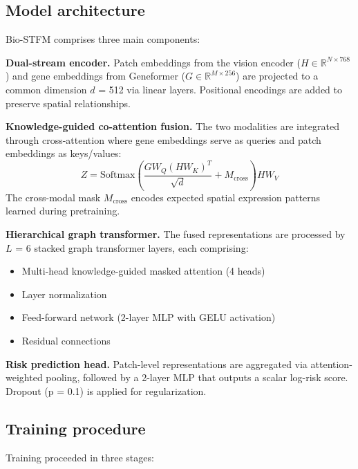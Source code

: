 \documentclass[pdflatex,sn-nature]{sn-jnl}%
\theoremstyle{thmstyleone}%
\theoremstyle{thmstyletwo}%
\theoremstyle{thmstylethree}%
\begin{document}
\subsection{Model architecture}

Bio-STFM comprises three main components:

\textbf{Dual-stream encoder.} Patch embeddings from the vision encoder ($H \in \mathbb{R}^{N \times 768}$) and gene embeddings from Geneformer ($G \in \mathbb{R}^{M \times 256}$) are projected to a common dimension $d$ = 512 via linear layers. Positional encodings are added to preserve spatial relationships.

\textbf{Knowledge-guided co-attention fusion.} The two modalities are integrated through cross-attention where gene embeddings serve as queries and patch embeddings as keys/values:
\begin{equation}
Z = \text{Softmax}\left(\frac{G W_Q (H W_K)^T}{\sqrt{d}} + M_{\text{cross}}\right) H W_V
\end{equation}
The cross-modal mask $M_{\text{cross}}$ encodes expected spatial expression patterns learned during pretraining.

\textbf{Hierarchical graph transformer.} The fused representations are processed by $L$ = 6 stacked graph transformer layers\cite{bib37}, each comprising:
\begin{itemize}
\item Multi-head knowledge-guided masked attention (4 heads)\cite{bib51}
\item Layer normalization
\item Feed-forward network (2-layer MLP with GELU activation)
\item Residual connections
\end{itemize}

\textbf{Risk prediction head.} Patch-level representations are aggregated via attention-weighted pooling, followed by a 2-layer MLP that outputs a scalar log-risk score. Dropout (p = 0.1) is applied for regularization.

\subsection{Training procedure}

Training proceeded in three stages:
\end{document}
